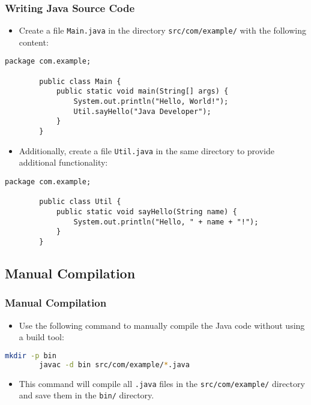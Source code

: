 \documentclass[aspectratio=169, table]{beamer}
\begin{document}
\begin{frame}[fragile]
	\vspace{20pt}
	\frametitle{Writing Java Source Code}
	\begin{itemize}
		\item Create a file \texttt{Main.java} in the directory \texttt{src/com/example/} with the following content:
	\end{itemize}
	\begin{lstlisting}[style=JavaStyle]
		package com.example;
		
		public class Main {
			public static void main(String[] args) {
				System.out.println("Hello, World!");
				Util.sayHello("Java Developer");
			}
		}
	\end{lstlisting}
	\begin{itemize}
		\item Additionally, create a file \texttt{Util.java} in the same directory to provide additional functionality:
	\end{itemize}
	\begin{lstlisting}[style=JavaStyle]
		package com.example;
		
		public class Util {
			public static void sayHello(String name) {
				System.out.println("Hello, " + name + "!");
			}
		}
	\end{lstlisting}
\end{frame}

\subsection{Manual Compilation}

\begin{frame}[fragile]
	\frametitle{Manual Compilation}
	\begin{itemize}
		\item Use the following command to manually compile the Java code without using a build tool:
	\end{itemize}
	\begin{lstlisting}[language=bash]
		mkdir -p bin
		javac -d bin src/com/example/*.java
	\end{lstlisting}
	\begin{itemize}
		\item This command will compile all \texttt{.java} files in the \texttt{src/com/example/} directory and save them in the \texttt{bin/} directory.
	\end{itemize}
\end{frame}
\end{document}
